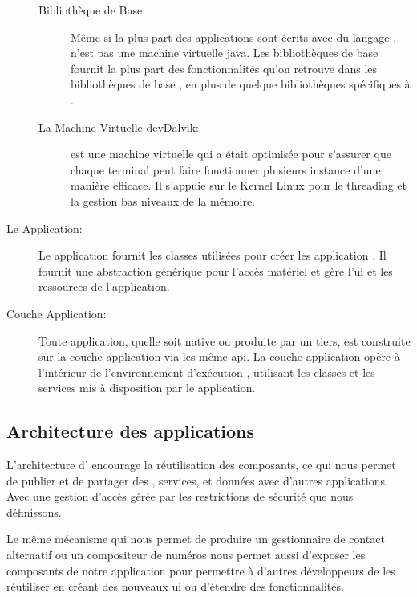 \begin{description}
\begin{description}
\item [Bibliothèque de Base:]

Même si la plus part des applications \android{} sont écrits avec du langage
,  n'est pas une machine virtuelle java. Les bibliothèques
\android{} de base fournit la plus part des fonctionnalités qu'on retrouve
dans les bibliothèques de base , en plus de quelque bibliothèques
spécifiques à \android{}.

\item [La Machine Virtuelle dev{Dalvik}:]

 est une machine virtuelle qui a était optimisée pour
s'assurer que chaque terminal peut faire fonctionner plusieurs instance
d'une manière efficace. Il s’appuie sur le Kernel Linux pour le
threading et la gestion bas niveaux de la mémoire.

\end{description}

\item [Le \en{Framework} Application:]

Le  application fournit les classes utilisées pour créer les application \android{}. Il fournit une abstraction générique pour l’accès matériel et gère l'\gls{ui} et les ressources de l'application.

\item [Couche Application:]

Toute application, quelle soit native ou produite par un tiers, est
construite sur la couche application via les même \gls{api}. La couche
application opère à l'intérieur de l'environnement d’exécution \android{},
utilisant les classes et les services mis à disposition par le 
application.

\end{description}

\subsection[Architecture des applications \android{}]{Architecture des applications \android{}\cite{pa4ad:chptr1}}

L'architecture d'\android{} encourage la réutilisation des composants,
ce qui nous permet de publier et de partager des ,
services, et données avec d'autres applications. Avec une gestion
d'accès gérée par les restrictions de sécurité que nous définissons.

Le même mécanisme qui nous permet de produire un gestionnaire de contact alternatif ou un compositeur de numéros nous permet aussi d'exposer les composants de notre application pour permettre à d'autres développeurs de les réutiliser en créant des nouveaux \gls{ui} ou d’étendre des fonctionnalités.


